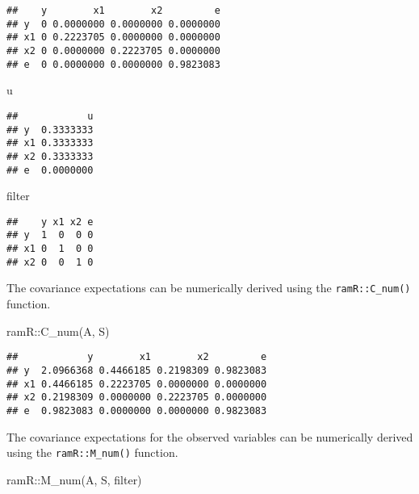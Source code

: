 \documentclass[
]{book}
\newenvironment{Shaded}{\begin{snugshade}}{\end{snugshade}}
\newcommand{\FunctionTok}[1]{\textcolor[rgb]{0.00,0.00,0.00}{#1}}
\newcommand{\NormalTok}[1]{#1}
\newcommand{\SpecialCharTok}[1]{\textcolor[rgb]{0.00,0.00,0.00}{#1}}
\theoremstyle{definition}
\theoremstyle{definition}
\theoremstyle{definition}
\theoremstyle{remark}
\begin{document}
\begin{verbatim}
##    y        x1        x2         e
## y  0 0.0000000 0.0000000 0.0000000
## x1 0 0.2223705 0.0000000 0.0000000
## x2 0 0.0000000 0.2223705 0.0000000
## e  0 0.0000000 0.0000000 0.9823083
\end{verbatim}

\begin{Shaded}
\begin{Highlighting}[]
\NormalTok{u}
\end{Highlighting}
\end{Shaded}

\begin{verbatim}
##            u
## y  0.3333333
## x1 0.3333333
## x2 0.3333333
## e  0.0000000
\end{verbatim}

\begin{Shaded}
\begin{Highlighting}[]
\NormalTok{filter}
\end{Highlighting}
\end{Shaded}

\begin{verbatim}
##    y x1 x2 e
## y  1  0  0 0
## x1 0  1  0 0
## x2 0  0  1 0
\end{verbatim}

The covariance expectations
can be numerically derived using the \texttt{ramR::C\_num()} function.

\begin{Shaded}
\begin{Highlighting}[]
\NormalTok{ramR}\SpecialCharTok{::}\FunctionTok{C\_num}\NormalTok{(A, S)}
\end{Highlighting}
\end{Shaded}

\begin{verbatim}
##            y        x1        x2         e
## y  2.0966368 0.4466185 0.2198309 0.9823083
## x1 0.4466185 0.2223705 0.0000000 0.0000000
## x2 0.2198309 0.0000000 0.2223705 0.0000000
## e  0.9823083 0.0000000 0.0000000 0.9823083
\end{verbatim}

The covariance expectations for the observed variables
can be numerically derived using the \texttt{ramR::M\_num()} function.

\begin{Shaded}
\begin{Highlighting}[]
\NormalTok{ramR}\SpecialCharTok{::}\FunctionTok{M\_num}\NormalTok{(A, S, filter)}
\end{Highlighting}
\end{Shaded}
\end{document}
